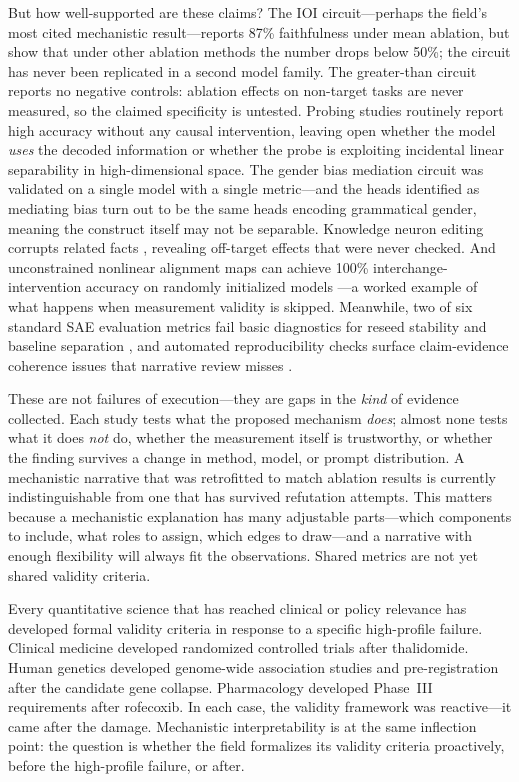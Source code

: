 \documentclass[10pt]{article}
\begin{document}
But how well-supported are these claims? The IOI circuit---perhaps the field's most cited
mechanistic result---reports 87\% faithfulness under mean ablation, but
\citet{miller2024transformer} show that under other ablation methods the number drops below
50\%; the circuit has never been replicated in a second model family. The greater-than
circuit reports no negative controls: ablation effects on non-target tasks are never
measured, so the claimed specificity is untested. Probing studies routinely report high
accuracy without any causal intervention, leaving open whether the model \emph{uses} the
decoded information or whether the probe is exploiting incidental linear separability in
high-dimensional space. The gender bias mediation circuit was validated on a single model
with a single metric---and the heads identified as mediating bias turn out to be the same
heads encoding grammatical gender, meaning the construct itself may not be separable.
Knowledge neuron editing corrupts related facts \citep{dai2022knowledge}, revealing
off-target effects that were never checked. And unconstrained nonlinear alignment maps can
achieve 100\% interchange-intervention accuracy on randomly initialized models
\citep{sutter2025nonlinear}---a worked example of what happens when measurement validity is
skipped. Meanwhile, two of six standard SAE evaluation metrics fail basic diagnostics for
reseed stability and baseline separation \citep{karvonen2025saebench}, and automated
reproducibility checks surface claim-evidence coherence issues that narrative review misses
\citep{bai2026mecheval}.

These are not failures of execution---they are gaps in the \emph{kind} of evidence
collected. Each study tests what the proposed mechanism \emph{does}; almost none tests what
it does \emph{not} do, whether the measurement itself is trustworthy, or whether the
finding survives a change in method, model, or prompt distribution. A mechanistic
narrative that was retrofitted to match ablation results is currently indistinguishable
from one that has survived refutation attempts. This matters because a mechanistic
explanation has many adjustable parts---which components to include, what roles to assign,
which edges to draw---and a narrative with enough flexibility will always fit the
observations. Shared metrics are not yet shared validity criteria.

Every quantitative science that has reached clinical or policy relevance has developed formal validity criteria in response to a specific high-profile failure. Clinical medicine developed randomized controlled trials after thalidomide. Human genetics developed genome-wide association studies and pre-registration after the candidate gene collapse. Pharmacology developed Phase~III requirements after rofecoxib. In each case, the validity framework was reactive---it came after the damage. Mechanistic interpretability is at the same inflection point: the question is whether the field formalizes its validity criteria proactively, before the high-profile failure, or after.
\end{document}
